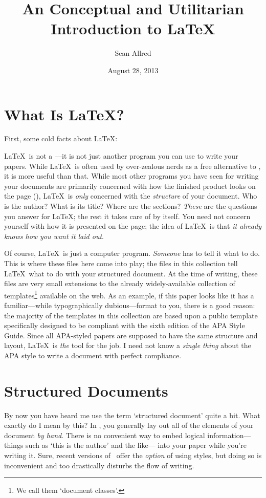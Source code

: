\documentclass{psypaper}
\title{An Conceptual and Utilitarian Introduction to \LaTeX}
\author{Sean Allred}
\date{August 28, 2013}
\begin{document}
\maketitle

\section{What Is \LaTeX?}
First, some cold facts about \LaTeX:

\LaTeX\ is not a \wysiwyg---it is not just another program you can use to write your papers.
While \LaTeX\ is often used by over-zealous nerds as a free alternative to \MicrosoftWord,
  it is more useful than that.
While most other programs you have seen for writing your documents
  are primarily concerned with how the finished product looks on the page (\wysiwyg),
  \LaTeX\ is \emph{only} concerned with the \emph{structure} of your document.
Who is the author?
What is its title?
Where are the sections?
\emph{These} are the questions you answer for \LaTeX;
  the rest it takes care of by itself.
You need not concern yourself with how it is presented on the page;
  the idea of \LaTeX\ is that \emph{it already knows how you want it laid out}.

Of course, \LaTeX\ is just a computer program.
\emph{Someone} has to tell it what to do.
This is where these files here come into play;
  the files in this collection tell \LaTeX\ what to do
  with your structured document.
At the time of writing, these files are very small extensions
  to the already widely-available collection of templates\footnote{We call them `document classes'.}
  available on the web.
As an example, if this paper looks like it has
  a familiar---while typographically dubious---format to you,
  there is a good reason: the majority of the templates in this collection
  are based upon a public template specifically designed
  to be compliant with the sixth edition of the APA Style Guide.
Since all APA-styled papers are supposed to have the same structure and layout,
  \LaTeX\ is \emph{the} tool for the job.
I need not know a \emph{single thing} about the APA style
  to write a document with perfect compliance.

\section{Structured Documents}
By now you have heard me use the term `structured document' quite a bit.
What exactly do I mean by this?
In \MicrosoftWord, you generally lay out all of the elements of your document \emph{by hand}.
There is no convenient way to embed logical information---%
  things such as `this is the author' and the like---%
  into your paper while you're writing it.
Sure, recent versions of \MicrosoftWord\ offer the \emph{option} of using styles,
  but doing so is inconvenient and
  too drastically disturbs the flow of writing. %
\end{document}
